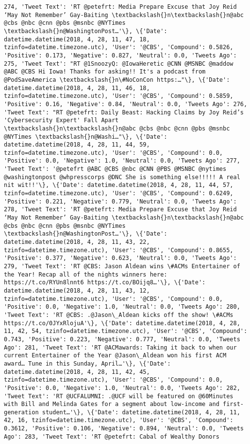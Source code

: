 \documentclass[11pt]{article}
\begin{document}
\begin{Verbatim}[commandchars=\\\{\}]
274, 'Tweet Text': 'RT @petefrt: Media Prepare Excuse that Joy Reid ‘May Not Remember’ Gay-Baiting \textbackslash{}n\textbackslash{}n@abc @cbs @nbc @cnn @pbs @msnbc @NYTimes \textbackslash{}n@WashingtonPost…'\}, \{'Date': datetime.datetime(2018, 4, 28, 11, 47, 18, tzinfo=datetime.timezone.utc), 'User': '@CBS', 'Compound': 0.5826, 'Positive': 0.173, 'Negative': 0.827, 'Neutral': 0.0, 'Tweets Ago': 275, 'Tweet Text': "RT @1SnoozyQ: @IowaHeretic @CNN @MSNBC @maddow @ABC @CBS Hi Iowa! Thanks for asking!! It's a podcast from @PodSaveAmerica \textbackslash{}n\#NoConCon https:…"\}, \{'Date': datetime.datetime(2018, 4, 28, 11, 46, 18, tzinfo=datetime.timezone.utc), 'User': '@CBS', 'Compound': 0.5859, 'Positive': 0.16, 'Negative': 0.84, 'Neutral': 0.0, 'Tweets Ago': 276, 'Tweet Text': "RT @petefrt: Daily Beast: Hacking Claims by Joy Reid’s 'Cybersecurity Expert' Fall Apart \textbackslash{}n\textbackslash{}n@abc @cbs @nbc @cnn @pbs @msnbc @NYTimes \textbackslash{}n@Washi…"\}, \{'Date': datetime.datetime(2018, 4, 28, 11, 44, 59, tzinfo=datetime.timezone.utc), 'User': '@CBS', 'Compound': 0.0, 'Positive': 0.0, 'Negative': 1.0, 'Neutral': 0.0, 'Tweets Ago': 277, 'Tweet Text': '@petefrt @ABC @CBS @nbc @CNN @PBS @MSNBC @nytimes @washingtonpost @whpresscorps @DNC She is something else!!!!! A real nit wit!!'\}, \{'Date': datetime.datetime(2018, 4, 28, 11, 44, 57, tzinfo=datetime.timezone.utc), 'User': '@CBS', 'Compound': 0.6249, 'Positive': 0.221, 'Negative': 0.779, 'Neutral': 0.0, 'Tweets Ago': 278, 'Tweet Text': 'RT @petefrt: Media Prepare Excuse that Joy Reid ‘May Not Remember’ Gay-Baiting \textbackslash{}n\textbackslash{}n@abc @cbs @nbc @cnn @pbs @msnbc @NYTimes \textbackslash{}n@WashingtonPost…'\}, \{'Date': datetime.datetime(2018, 4, 28, 11, 43, 22, tzinfo=datetime.timezone.utc), 'User': '@CBS', 'Compound': 0.8655, 'Positive': 0.377, 'Negative': 0.623, 'Neutral': 0.0, 'Tweets Ago': 279, 'Tweet Text': 'RT @CBS: Jason Aldean wins \#ACMs Entertainer of the Year! Recap all of the nights winners here: https://t.co/RYUn8lnnt6 https://t.co/BOijq8…'\}, \{'Date': datetime.datetime(2018, 4, 28, 11, 43, 12, tzinfo=datetime.timezone.utc), 'User': '@CBS', 'Compound': 0.0, 'Positive': 0.0, 'Negative': 1.0, 'Neutral': 0.0, 'Tweets Ago': 280, 'Tweet Text': 'RT @CBS: .@Jason\_Aldean kicks off the show! \#ACMs https://t.co/0JYxRlojuA'\}, \{'Date': datetime.datetime(2018, 4, 28, 11, 42, 54, tzinfo=datetime.timezone.utc), 'User': '@CBS', 'Compound': 0.743, 'Positive': 0.223, 'Negative': 0.777, 'Neutral': 0.0, 'Tweets Ago': 281, 'Tweet Text': 'RT @ACMawards: Taking it back to when our current Entertainer of the Year @Jason\_Aldean won his first ACM award… Tune in this Sunday, April…'\}, \{'Date': datetime.datetime(2018, 4, 28, 11, 42, 45, tzinfo=datetime.timezone.utc), 'User': '@CBS', 'Compound': 0.0, 'Positive': 0.0, 'Negative': 1.0, 'Neutral': 0.0, 'Tweets Ago': 282, 'Tweet Text': 'RT @UCFALUMNI: .@UCF will be featured on @60Minutes with Bill and Melinda Gates for a segment about low-income and first-generation student…'\}, \{'Date': datetime.datetime(2018, 4, 28, 11, 42, 16, tzinfo=datetime.timezone.utc), 'User': '@CBS', 'Compound': 0.3612, 'Positive': 0.106, 'Negative': 0.894, 'Neutral': 0.0, 'Tweets Ago': 283, 'Tweet Text': 'RT @petefrt: Cabal of Wealthy Donors 
\end{Verbatim}
\end{document}
